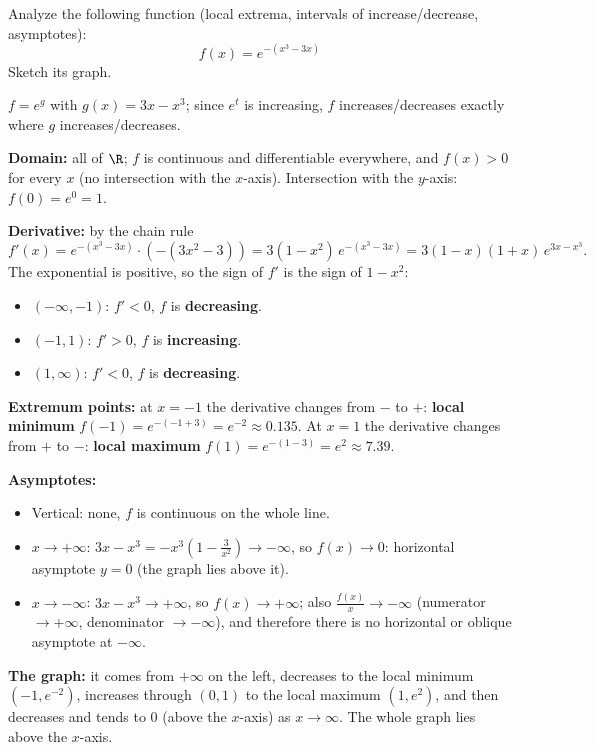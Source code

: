 
\begin{question}
Analyze the following function (local extrema, intervals of increase/decrease, asymptotes):
\[ f(x)=e^{-(x^3-3x)} \]
Sketch its graph.
\end{question}

\begin{hint}
$f=e^{g}$ with $g(x)=3x-x^3$; since $e^t$ is increasing, $f$ increases/decreases exactly where $g$ increases/decreases.
\end{hint}

\begin{solution}
\textbf{Domain:} all of $\R$; $f$ is continuous and differentiable everywhere, and $f(x)>0$ for every $x$ (no intersection with the $x$-axis). Intersection with the $y$-axis: $f(0)=e^0=1$.

\textbf{Derivative:} by the chain rule
\[ f'(x)=e^{-(x^3-3x)}\cdot(-(3x^2-3))=3(1-x^2)\,e^{-(x^3-3x)}=3(1-x)(1+x)\,e^{3x-x^3}. \]
The exponential is positive, so the sign of $f'$ is the sign of $1-x^2$:
\begin{itemize}
  \item $(-\infty,-1)$: $f'<0$, $f$ is \textbf{decreasing}.
  \item $(-1,1)$: $f'>0$, $f$ is \textbf{increasing}.
  \item $(1,\infty)$: $f'<0$, $f$ is \textbf{decreasing}.
\end{itemize}

\textbf{Extremum points:} at $x=-1$ the derivative changes from $-$ to $+$: \textbf{local minimum} $f(-1)=e^{-(-1+3)}=e^{-2}\approx0.135$. At $x=1$ the derivative changes from $+$ to $-$: \textbf{local maximum} $f(1)=e^{-(1-3)}=e^{2}\approx7.39$.

\textbf{Asymptotes:}
\begin{itemize}
  \item Vertical: none, $f$ is continuous on the whole line.
  \item $x\to+\infty$: $3x-x^3=-x^3\left(1-\frac{3}{x^2}\right)\to-\infty$, so $f(x)\to0$: horizontal asymptote $y=0$ (the graph lies above it).
  \item $x\to-\infty$: $3x-x^3\to+\infty$, so $f(x)\to+\infty$; also $\frac{f(x)}{x}\to-\infty$ (numerator $\to+\infty$, denominator $\to-\infty$), and therefore there is no horizontal or oblique asymptote at $-\infty$.
\end{itemize}

\textbf{The graph:} it comes from $+\infty$ on the left, decreases to the local minimum $(-1,e^{-2})$, increases through $(0,1)$ to the local maximum $(1,e^2)$, and then decreases and tends to $0$ (above the $x$-axis) as $x\to\infty$. The whole graph lies above the $x$-axis.
\end{solution}
